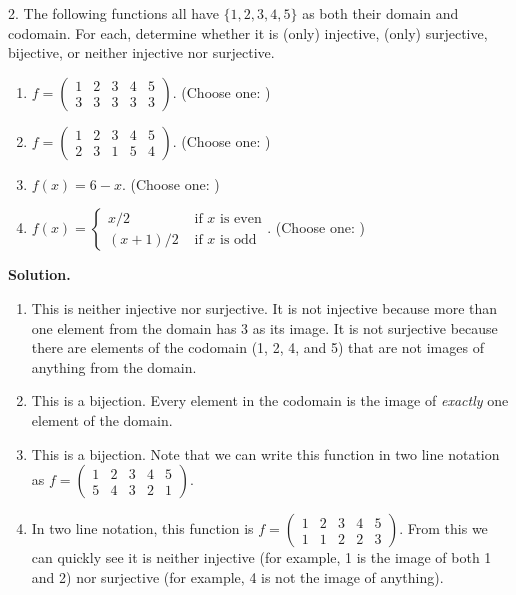 \documentclass[10pt,]{book}
\theoremstyle{plain}
\theoremstyle{definition}
\theoremstyle{definition}
\numberwithin{equation}{chapter}
\newcommand{\twoline}[2]{\begin{pmatrix}#1 \\ #2 \end{pmatrix}}
\newcommand{\amp}{&}
\begin{document}
\begin{exerciselist}
%
\par
\item[2.]\hypertarget{exercise-44}{}\noindent%
\hypertarget{p-646}{}%
The following functions all have \(\{1,2,3,4,5\}\) as both their domain and codomain.  For each, determine whether it is (only) injective, (only) surjective, bijective, or neither injective nor surjective.%
\par
\hypertarget{p-647}{}%
\leavevmode%
\begin{enumerate}[label=(\alph*)]
\item\hypertarget{li-411}{}\hypertarget{p-648}{}%
\(f = \twoline{1 \amp 2 \amp 3 \amp 4 \amp 5}{3 \amp 3 \amp 3 \amp 3 \amp 3}\). (Choose one: )%
\item\hypertarget{li-412}{}\hypertarget{p-649}{}%
\(f = \twoline{1 \amp 2 \amp 3 \amp 4 \amp 5}{2 \amp 3 \amp 1 \amp 5 \amp 4}\). (Choose one: )%
\item\hypertarget{li-413}{}\hypertarget{p-650}{}%
\(f(x) = 6 - x\).  (Choose one: )%
\item\hypertarget{li-414}{}\hypertarget{p-651}{}%
\(f(x) = \begin{cases} x/2 \amp \text{ if } x \text{ is even} \\ (x+1)/2 \amp \text{ if } x \text{ is odd}\end{cases}\). (Choose one: )%
\end{enumerate}
%
\par
\medskip\noindent%
\textbf{Solution.}\quad \hypertarget{p-652}{}%
\leavevmode%
\begin{enumerate}[label=(\alph*)]
\item\hypertarget{li-415}{}\hypertarget{p-653}{}%
This is neither injective nor surjective.  It is not injective because more than one element from the domain has 3 as its image.  It is not surjective because there are elements of the codomain (1, 2, 4, and 5) that are not images of anything from the domain.%
\item\hypertarget{li-416}{}\hypertarget{p-654}{}%
This is a bijection.  Every element in the codomain is the image of \emph{exactly} one element of the domain.%
\item\hypertarget{li-417}{}\hypertarget{p-655}{}%
This is a bijection.  Note that we can write this function in two line notation as \(f = \twoline{1 \amp 2 \amp 3 \amp 4 \amp 5}{5 \amp 4 \amp 3 \amp 2 \amp 1}\).%
\item\hypertarget{li-418}{}\hypertarget{p-656}{}%
In two line notation, this function is \(f = \twoline{1 \amp 2 \amp 3 \amp 4 \amp 5}{1 \amp 1 \amp 2 \amp 2 \amp 3}\).  From this we can quickly see it is neither injective (for example, 1 is the image of both 1 and 2) nor surjective (for example, 4 is not the image of anything).%

\end{enumerate}
\end{exerciselist}
\end{document}
